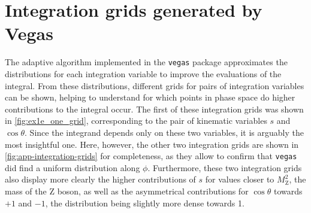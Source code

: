 \section{Integration grids generated by Vegas} \label{sec:app-int-grids}

The adaptive algorithm implemented in the \texttt{vegas} package approximates the distributions for each integration variable to improve the evaluations of the integral. From these distributions, different grids for pairs of integration variables can be shown, helping to understand for which points in phase space do higher contributions to the integral occur. The first of these integration grids was shown in \autoref{fig:ex1e_one_grid}, corresponding to the pair of kinematic variables $s$ and $\cos{\theta}$. Since the integrand depends only on these two variables, it is arguably the most insightful one. Here, however, the other two integration grids are shown in \autoref{fig:app-integration-grids} for completeness, as they allow to confirm that \texttt{vegas} did find a uniform distribution along $\phi$. Furthermore, these two integration grids also display more clearly the higher contributions of $s$ for values closer to $M_{\text{Z}}^{2}$, the mass of the Z boson, as well as the asymmetrical contributions for $\cos{\theta}$ towards $+1$ and $-1$, the distribution being slightly more dense towards 1.

